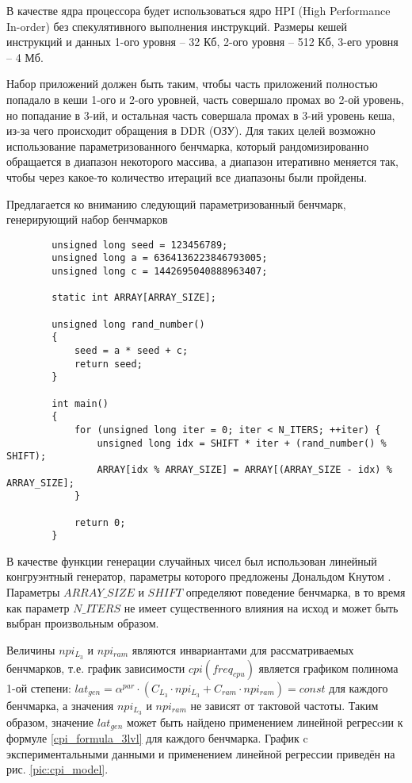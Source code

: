     В качестве ядра процессора будет использоваться ядро HPI (High Performance In-order)
    \cite{gem52017HPI} без спекулятивного выполнения инструкций. Размеры кешей инструкций и данных
    1-ого уровня -- 32 Кб, 2-ого уровня -- 512 Кб, 3-его уровня -- 4 Мб.

    Набор приложений должен быть таким, чтобы часть приложений полностью попадало в кеши 1-ого и 2-ого уровней,
    часть совершало промах во 2-ой уровень, но попадание в 3-ий, и остальная часть совершала промах в 3-ий уровень
    кеша, из-за чего происходит обращения в DDR (ОЗУ). Для таких целей возможно использование параметризованного
    бенчмарка, который рандомизированно обращается в диапазон некоторого массива, а диапазон итеративно меняется так,
    чтобы через какое-то количество итераций все диапазоны были пройдены.

    Предлагается ко вниманию следующий параметризованный бенчмарк, генерирующий набор бенчмарков

    \begin{lstlisting}
        unsigned long seed = 123456789;
        unsigned long a = 6364136223846793005;
        unsigned long c = 1442695040888963407;

        static int ARRAY[ARRAY_SIZE];

        unsigned long rand_number()
        {
            seed = a * seed + c;
            return seed;
        }

        int main()
        {
            for (unsigned long iter = 0; iter < N_ITERS; ++iter) {
                unsigned long idx = SHIFT * iter + (rand_number() % SHIFT);
                ARRAY[idx % ARRAY_SIZE] = ARRAY[(ARRAY_SIZE - idx) % ARRAY_SIZE];
            }

            return 0;
        }
    \end{lstlisting}

    В качестве функции генерации случайных чисел был использован линейный конгруэнтный генератор,
    параметры которого предложены Дональдом Кнутом \cite{knuth1973art}. Параметры $ARRAY\_SIZE$ и $SHIFT$
    определяют поведение бенчмарка, в то время как параметр $N\_ITERS$ не имеет существенного влияния на исход и
    может быть выбран произвольным образом.

    Величины $npi_{L_3}$ и $npi_{ram}$ являются инвариантами для рассматриваемых бенчмарков, т.е.
    график зависимости $cpi(freq_{cpu})$ является графиком полинома 1-ой степени:
    $lat_{gen} = \alpha^{par} \cdot \left( C_{L_3} \cdot npi_{L_3} + C_{ram} \cdot npi_{ram} \right) = const$
    для каждого бенчмарка, а значения $npi_{L_3}$ и $npi_{ram}$ не зависят от тактовой частоты.
    Таким образом, значение $lat_{gen}$ может быть найдено
    применением линейной регресcии к формуле \eqref{cpi_formula_3lvl} для каждого бенчмарка.
    График c экспериментальными данными и применением линейной регрессии приведён на рис.
    \ref{pic:cpi_model}.

